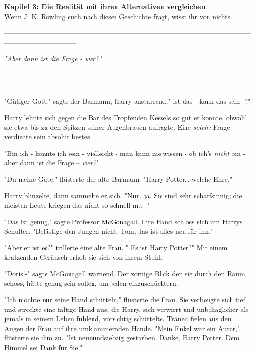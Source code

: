 

\hypertarget{die-realituxe4t-mit-ihren-alternativen-vergleichen}{%

\textbf{Kapitel 3: Die Realität mit ihren Alternativen vergleichen}\\

Wenn J. K. Rowling euch nach dieser Geschichte fragt, wisst ihr von nichts.

--------------------------------------------------------------------------------------------------------------------------------------------

\emph{"Aber dann ist die Frage - wer?"}

--------------------------------------------------------------------------------------------------------------------------------------------

"Gütiger Gott," sagte der Barmann, Harry anstarrend," ist das - kann das sein -?"

Harry lehnte sich gegen die Bar des Tropfenden Kessels so gut er konnte, obwohl sie etwa bis zu den Spitzen seiner Augenbrauen aufragte. Eine \emph{solche} Frage verdiente sein absolut bestes.

"Bin ich - könnte ich sein - vielleicht - man kann nie wissen - ob ich's \emph{nicht} bin - aber dann ist die Frage -- \emph{wer?}"

"Du meine Güte," flüsterte der alte Barmann. "Harry Potter… welche Ehre."

Harry blinzelte, dann sammelte er sich. "Nun, ja, Sie sind sehr scharfsinnig; die meisten Leute kriegen das nicht so schnell mit -"

"Das ist genug," sagte Professor McGonagall. Ihre Hand schloss sich um Harrys Schulter. "Belästige den Jungen nicht, Tom, das ist alles neu für ihn."

"Aber er ist es?" trillerte eine alte Frau. " Es ist Harry Potter?" Mit einem kratzenden Geräusch erhob sie sich von ihrem Stuhl.

"Doris -" sagte McGonagall warnend. Der zornige Blick den sie durch den Raum schoss, hätte genug sein sollen, um jeden einzuschüchtern.

"Ich möchte nur seine Hand schütteln," flüsterte die Frau. Sie verbeugte sich tief und streckte eine faltige Hand aus, die Harry, sich verwirrt und unbehaglicher als jemals in seinem Leben fühlend, vorsichtig schüttelte. Tränen fielen aus den Augen der Frau auf ihre umklammernden Hände. "Mein Enkel war ein Auror," flüsterte sie ihm zu. "Ist neunundsiebzig gestorben. Danke, Harry Potter. Dem Himmel sei Dank für Sie."

}
